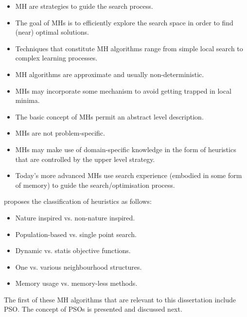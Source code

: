 \begin{itemize}
    \item \ac{MH} are strategies to guide the search process.
    
    \item The goal of \acp{MH} is to efficiently explore the search space in order to find (near) optimal solutions.
    
    \item Techniques that constitute \ac{MH} algorithms range from simple local search to complex learning processes.
    
    \item \ac{MH} algorithms are approximate and usually non-deterministic.
    
    \item \acp{MH} may incorporate some mechanism to avoid getting trapped in local minima.
    
    \item The basic concept of \acp{MH} permit an abstract level description.
    
    \item \acp{MH} are not problem-specific.
    
    \item \acp{MH} may make use of domain-specific knowledge  in the form of heuristics that are controlled by the upper level strategy.
    
    \item Today's more advanced \acp{MH} use search experience (embodied in some form of memory) to guide the search/optimisation process.
\end{itemize}

\citeauthor{ref:blum:2003} \cite{ref:blum:2003} proposes the classification of heuristics as follows:

\begin{itemize}
    \item Nature inspired vs. non-nature inspired.
    \item Population-based vs. single point search.
    \item Dynamic vs. statis objective functions.
    \item One vs. various neighbourhood structures.
    \item Memory usage vs. memory-less methods.
\end{itemize}

The first of these \ac{MH} algorithms that are relevant to this dissertation include \ac{PSO}. The concept of \acp{PSO} is presented and discussed next.


